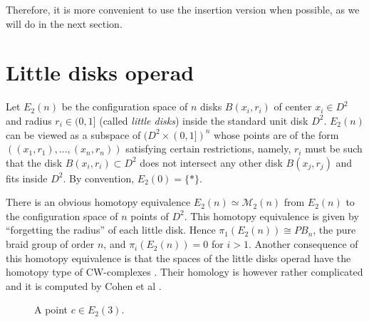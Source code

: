 \documentclass[TFM.tex]{subfiles}
\begin{document}
Therefore, it is more convenient to use the insertion version when possible, as we will do in the next section. 



\section{Little disks operad}\label{little}
 
 
 Let $E_2(n)$ be the configuration space of $n$ disks $B(x_i,r_i)$ of center $x_i\in D^2$ and radius $r_i\in (0,1]$ (called \emph{little disks}) inside the standard unit disk $D^2$. $E_2(n)$ can be viewed as a subspace of $(D^2\times (0,1])^n$ whose points are of the form $((x_1,r_1),\dots, (x_n,r_n))$ satisfying certain restrictions, namely, $r_i$ must be such that the disk $B(x_i,r_i)\subset D^2$ does not intersect any other disk $B(x_j,r_j)$ and fits inside $D^2$. By convention, $E_2(0)=\{*\}$.  
 
 There is an obvious homotopy equivalence $E_2(n)\simeq \mathcal{M}_2(n)$ from $E_2(n)$ to the configuration space of $n$ points of $D^2$. This homotopy equivalence is given by ``forgetting the radius'' of each little disk. %
   Hence $\pi_1(E_2(n))\cong PB_n$, the pure braid group of order $n$, and $\pi_i(E_2(n))=0$ for $i>1$. Another consequence of this homotopy equivalence is that the spaces of the little disks operad have the homotopy type of CW-complexes \cite{CW}. Their homology is however rather complicated and it is computed by Cohen et al \cite{cuentas}.  
 
 

\begin{figure}[h!]
\caption{A point $c\in E_2(3)$.}
 \end{figure}
 
\end{document}
